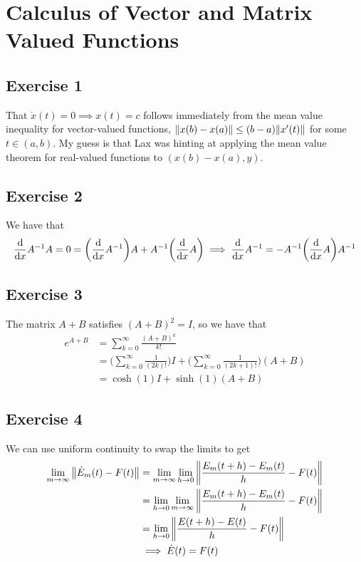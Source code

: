 \section{Calculus of Vector and Matrix Valued Functions}

\subsection{Exercise 1}
That $\dot{x}(t) = 0 \implies x(t) = c$ follows immediately from the mean value inequality for vector-valued
functions, $\norm{x(b) - x(a)} \leq (b - a) \norm{x'(t)}$ for some $t \in (a, b)$. My guess is that
Lax was hinting at applying the mean value theorem for real-valued functions to $(x(b) - x(a), y)$.

\subsection{Exercise 2}
We have that
\begin{align*}
        \dv{x} A^{-1} A = 0 = \bigg(\dv{x} A^{-1}\bigg) A + A^{-1} \bigg(\dv{x} A\bigg) \implies \dv{x} A^{-1} = -A^{-1} \bigg( \dv{x} A \bigg) A^{-1} 
\end{align*}

\subsection{Exercise 3}
The matrix $A + B$ satisfies $(A + B)^2 = I$, so we have that
\begin{align*}
        e^{A+B} &= \sum_{k = 0}^\infty \frac{(A + B)^k}{k!} \\
                &= \bigg(\sum_{k = 0}^\infty \frac{1}{(2k)!}\bigg) I +  \bigg(\sum_{k = 0}^\infty \frac{1}{(2k + 1)!}\bigg) (A + B) \\
                &= \cosh(1) I + \sinh(1) (A + B)
\end{align*}

\subsection{Exercise 4}
We can use uniform continuity to swap the limits to get
\begin{align*}
        \lim_{m \to \infty} \norm{\dot{E}_m(t) - F(t)} &= \lim_{m \to \infty} \lim_{h \to 0} \norm{\frac{E_m(t + h) - E_m(t)}{h} - F(t)} \\
                                                       &= \lim_{h \to 0} \lim_{m \to \infty} \norm{\frac{E_m(t + h) - E_m(t)}{h} - F(t)} \\
                                                       &= \lim_{h \to 0} \norm{\frac{E(t + h) - E(t)}{h} - F(t)} \\
                                                       &\implies \dot{E}(t) = F(t)
\end{align*}

